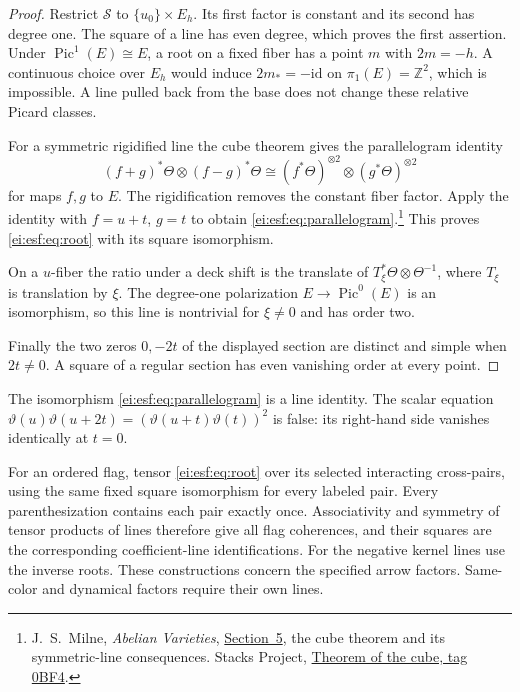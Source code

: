 \begin{proof}
Restrict $\mathcal S$ to $\{u_0\}\times E_h$. Its first
factor is constant and its second has degree one.
The square of a line has even degree, which proves the
first assertion. Under $\operatorname{Pic}^1(E)\cong E$,
a root on a fixed fiber has a point $m$ with $2m=-h$.
A continuous choice over $E_h$ would induce
$2m_*=-\mathrm{id}$ on $\pi_1(E)=\mathbb Z^2$, which is
impossible. A line pulled back from the base does not
change these relative Picard classes.

For a symmetric rigidified line the cube theorem gives
the parallelogram identity
\[
 (f+g)^*\Theta\otimes(f-g)^*\Theta
 \cong(f^*\Theta)^{\otimes2}\otimes(g^*\Theta)^{\otimes2}
\]
for maps $f,g$ to $E$. The rigidification removes the
constant fiber factor. Apply the identity with $f=u+t$, $g=t$
to obtain \eqref{ei:esf:eq:parallelogram}.\footnote{
J.~S.~Milne, \emph{Abelian Varieties},
\href{https://www.jmilne.org/math/CourseNotes/AV.pdf}{Section~5},
the cube theorem and its symmetric-line consequences.
Stacks Project, \href{https://stacks.math.columbia.edu/tag/0BF4}{
Theorem of the cube, tag 0BF4}.}
This proves \eqref{ei:esf:eq:root} with its square isomorphism.

On a $u$-fiber the ratio under a deck shift is the translate
of $T_\xi^*\Theta\otimes\Theta^{-1}$, where $T_\xi$ is
translation by $\xi$. The degree-one polarization
$E\to\operatorname{Pic}^0(E)$ is an isomorphism, so this
line is nontrivial for $\xi\ne0$ and has order two.

Finally the two zeros $0,-2t$ of the displayed section
are distinct and simple when $2t\ne0$. A square of a
regular section has even vanishing order at every point.
\end{proof}

The isomorphism \eqref{ei:esf:eq:parallelogram} is a line
identity. The scalar equation
$\vartheta(u)\vartheta(u+2t)=
(\vartheta(u+t)\vartheta(t))^2$ is false:
its right-hand side vanishes identically at $t=0$.

For an ordered flag, tensor \eqref{ei:esf:eq:root} over its
selected interacting cross-pairs, using the same fixed
square isomorphism for every labeled pair. Every
parenthesization contains each pair exactly once.
Associativity and symmetry of tensor products of lines
therefore give all flag coherences, and their squares
are the corresponding coefficient-line identifications.
For the negative kernel lines use the inverse roots.
These constructions concern the specified arrow factors.
Same-color and dynamical factors require their own lines.


